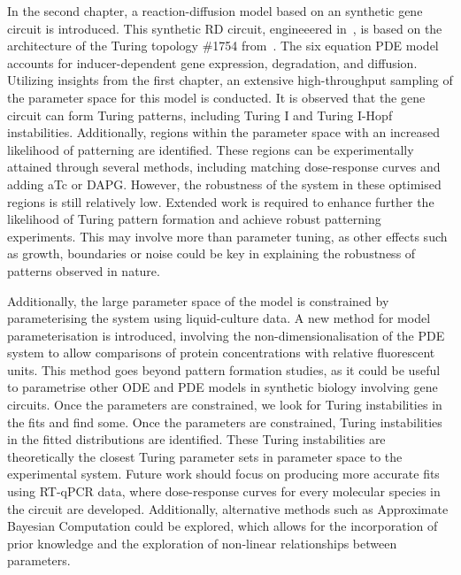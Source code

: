 In the second chapter, a reaction-diffusion model based on an synthetic gene circuit is introduced.
This synthetic RD circuit, engineeered in~\cite{Tica2020}, is based on the architecture of the Turing topology \#1754 from~\cite{Scholes2019}.
The six equation PDE model accounts for inducer-dependent gene expression, degradation, and diffusion.
Utilizing insights from the first chapter, an extensive high-throughput sampling of the parameter space for this model is conducted.
It is observed that the gene circuit can form Turing patterns, including Turing I and Turing I-Hopf instabilities.
Additionally, regions within the parameter space with an increased likelihood of patterning are identified.
These regions can be experimentally attained through several methods, including matching dose-response curves and adding aTc or DAPG.
However, the robustness of the system in these optimised regions is still relatively low.
Extended work is required to enhance further the likelihood of Turing pattern formation and achieve robust patterning experiments.
This may involve more than parameter tuning, as other effects such as growth, boundaries or noise could be key in explaining the robustness of patterns observed in nature.

Additionally, the large parameter space of the model is constrained by parameterising the system using liquid-culture data.
A new method for model parameterisation is introduced, involving the non-dimensionalisation of the PDE system to allow comparisons of protein concentrations with relative fluorescent units.
This method goes beyond pattern formation studies, as it could be useful to parametrise other ODE and PDE models in synthetic biology involving gene circuits.
Once the parameters are constrained, we look for Turing instabilities in the fits and find some.
Once the parameters are constrained, Turing instabilities in the fitted distributions are identified.
These Turing instabilities are theoretically the closest Turing parameter sets in parameter space to the experimental system.
Future work should focus on producing more accurate fits using RT-qPCR data, where dose-response curves for every molecular species in the circuit are developed.
Additionally, alternative methods such as Approximate Bayesian Computation could be explored, which allows for the incorporation of prior knowledge and the exploration of non-linear relationships between parameters.

